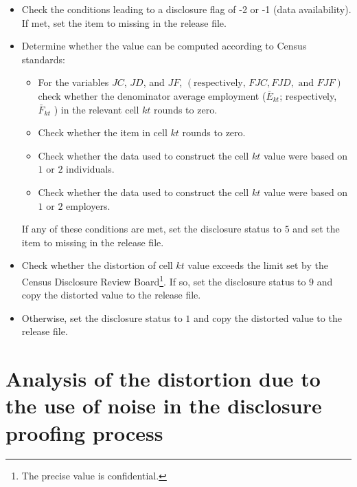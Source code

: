 \begin{itemize}
\item Check the conditions leading to a disclosure flag of -2 or -1 (data
availability). If met, set the item to missing in the release file.

\item Determine whether the value can be computed according to Census
standards:

\begin{itemize}
\item For the variables $JC$, $JD$, and $JF$, $\left( 
\text{respectively, }FJC,FJD,\text{ and }FJF\right) $ check whether the
denominator average employment ($\bar{E}_{kt}$; respectively, $\bar{F}_{kt}$%
) in the relevant cell $kt$ rounds to zero. %

\item Check whether the item in cell $kt$ rounds to zero. %

\item Check whether the data used to construct the cell $kt$ value were
based on $1$ or $2$ individuals. 

\item Check whether the data used to construct the cell $kt$ value were
based on $1$ or $2$ employers. 
\end{itemize}

If any of these conditions are met, set the disclosure status to $5$ and set
the item to missing in the release file.

\item Check whether the distortion of cell $kt$ value exceeds the limit set
by the Census Disclosure Review Board\footnote{%
The precise value is confidential.}. If so, set the disclosure status to $9$
and copy the distorted value to the release file.

\item Otherwise, set the disclosure status to $1$ and copy the distorted value
to the release file.
\end{itemize}

%
%
%

\section{Analysis of the distortion due to the use of noise in the
disclosure proofing process}

